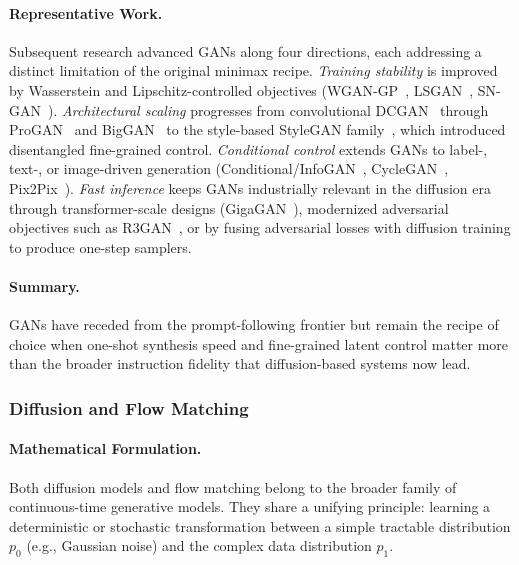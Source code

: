 \paragraph{Representative Work.}
Subsequent research advanced GANs along four directions, each addressing a distinct limitation of the original minimax recipe. \emph{Training stability} is improved by Wasserstein and Lipschitz-controlled objectives (WGAN-GP~\citep{gulrajani2017improvedtrainingwassersteingans}, LSGAN~\citep{mao2017squaresgenerativeadversarialnetworks}, SN-GAN~\citep{miyato2018spectralnormalizationgenerativeadversarial}). \emph{Architectural scaling} progresses from convolutional DCGAN~\citep{radford2016unsupervisedrepresentationlearningdeep} through ProGAN~\citep{salimans2022progressive} and BigGAN~\citep{brock2019largescalegantraining} to the style-based StyleGAN family~\citep{karras2019stylebasedgeneratorarchitecturegenerative}, which introduced disentangled fine-grained control. \emph{Conditional control} extends GANs to label-, text-, or image-driven generation (Conditional/InfoGAN~\citep{chen2016infoganinterpretablerepresentationlearning}, CycleGAN~\citep{zhu2020unpairedimagetoimagetranslationusing}, Pix2Pix~\citep{isola2017image}). \emph{Fast inference} keeps GANs industrially relevant in the diffusion era through transformer-scale designs (GigaGAN~\citep{kang2023gigagan}), modernized adversarial objectives such as R3GAN~\citep{huang2025r3gan}, or by fusing adversarial losses with diffusion training to produce one-step samplers.

\paragraph{Summary.}
GANs have receded from the prompt-following frontier but remain the recipe of choice when one-shot synthesis speed and fine-grained latent control matter more than the broader instruction fidelity that diffusion-based systems now lead.

\subsubsection{Diffusion and Flow Matching}

\paragraph{Mathematical Formulation.}
Both diffusion models and flow matching belong to the broader family of continuous-time generative models. They share a unifying principle: learning a deterministic or stochastic transformation between a simple tractable distribution $p_0$ (e.g., Gaussian noise) and the complex data distribution $p_1$.

